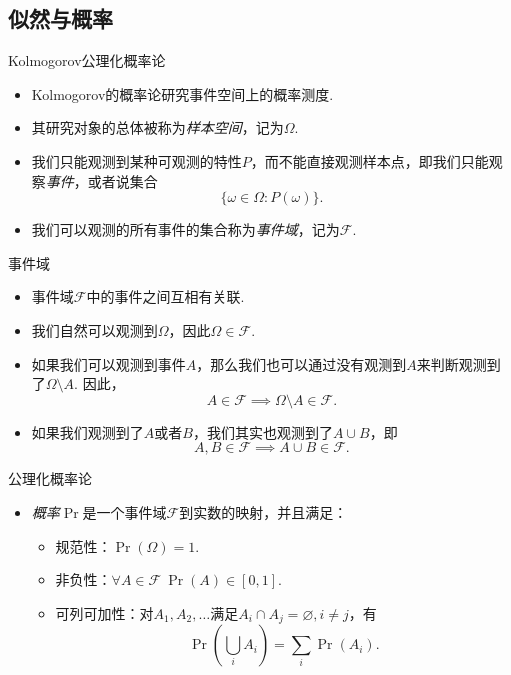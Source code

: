 \subsection{似然与概率}
\begin{frame}{Kolmogorov公理化概率论}
\begin{itemize}
    \item Kolmogorov的概率论研究事件空间上的概率测度.
    \item 其研究对象的总体被称为\emph{样本空间}，记为$\Omega$.
    \item 我们只能观测到某种可观测的特性$P$，而不能直接观测样本点，即我们只能观察\emph{事件}，或者说集合
    \[\{\omega\in \Omega:P(\omega)\}.\]
    \item 我们可以观测的所有事件的集合称为\emph{事件域}，记为$\mathscr{F}$.
\end{itemize}
\end{frame}

\begin{frame}{事件域}
\begin{itemize}
    \item 事件域$\mathscr{F}$中的事件之间互相有关联.
    \item 我们自然可以观测到$\Omega$，因此$\Omega\in\mathscr{F}$.
    \item 如果我们可以观测到事件$A$，那么我们也可以通过没有观测到$A$来判断观测到了$\Omega\setminus A$. 因此，
    \[A\in\mathscr{F}\implies \Omega\setminus A\in\mathscr{F}.\]
    \item 如果我们观测到了$A$或者$B$，我们其实也观测到了$A\cup B$，即
    \[A,B\in\mathscr{F}\implies A\cup B\in\mathscr{F}.\]
\end{itemize}
\end{frame}

\begin{frame}{公理化概率论}
\begin{itemize}
    \item \emph{概率}$\Pr$是一个事件域$\mathscr{F}$到实数的映射，并且满足：
    \begin{itemize}
        \item 规范性：$\Pr(\Omega)=1$.
        \item 非负性：$\forall A\in\mathscr{F}~\Pr(A)\in[0,1]$.
        \item 可列可加性：对$A_1,A_2,\dots$满足$A_i\cap A_j=\varnothing,i\neq j$，有
        \[\Pr\left(\bigcup_i A_i\right)=\sum_i \Pr(A_i).\]
    \end{itemize}
\end{itemize}
\end{frame}

